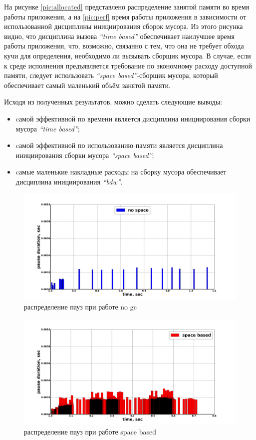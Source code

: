 \documentclass[14pt]{extarticle}
\begin{document}
На рисунке \ref{pic:allocated} представлено распределение занятой памяти во время работы 
приложения, а на \ref{pic:perf} время работы приложения в зависимости
от использованной дисциплины инициирования сборок мусора. Из этого рисунка видно, что дисциплина вызова 
\textit{``time based''} обеспечивает наилучшее время работы приложения, что, возможно,
связанно с тем, что она не требует обхода кучи для определения, необходимо 
ли вызывать сборщик мусора. В случае, если к среде исполнения предъявляется требование
по экономному расходу доступной памяти, следует использовать \textit{``space based''}-сборщик
мусора, который обеспечивает самый маленький объём занятой памяти.

Исходя из полученных результатов, можно сделать следующие выводы:
\begin{itemize}
\item cамой эффективной по времени является дисциплина инициирования сборки мусора
\textit{``time based''};
\item cамой эффективной по использованию памяти является дисциплина инициирования
сборки мусора \textit{``space based''};
\item cамые маленькие накладные расходы на сборку мусора обеспечивает
дисциплина инициирования \textit{``bdw''}.
\end{itemize}

\begin{figure}[ph]
\caption{\label{pic:pause-no-gc}распределение пауз при работе no gc}
\includegraphics[width=1\linewidth]{no-apce.png}
\end{figure}

\begin{figure}[ph]
\caption{\label{pic:space-based-pause}распределение пауз при работе space based}
\includegraphics[width=1\linewidth]{space-based-pause-same.png}
\end{figure}
\end{document}
